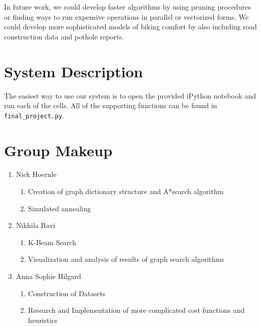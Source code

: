 \documentclass[11pt]{article}
\begin{document}
In future work, we could develop faster algorithms by using pruning procedures or finding ways to run expensive operations in parallel or vectorized forms. We could develop more sophisticated models of biking comfort by also including road construction data and pothole reports.

\appendix

\section{System Description}

The easiest way to use our system is to open the provided iPython notebook and run each of the cells. All of the supporting functions can be found in \texttt{final\_project.py}.

\section{Group Makeup}

\begin{enumerate}
\item Nick Hoernle
\begin{enumerate}
\item Creation of graph dictionary structure and A*search algorithm
\item Simulated annealing
\end{enumerate}
\item Nikhila Ravi
\begin{enumerate}
\item K-Beam Search
\item Visualization and analysis of results of graph search algorithms
\end{enumerate}
\item Anna Sophie Hilgard
\begin{enumerate}
\item Construction of Datasets
\item Research and Implementation of more complicated cost functions and heuristics
\end{enumerate}
\end{enumerate}


 

\end{document}
